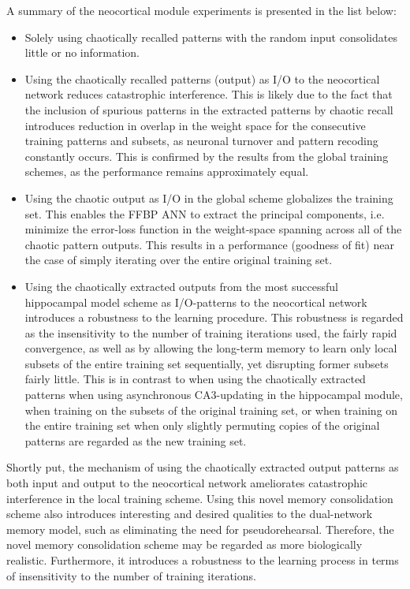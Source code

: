 A summary of the neocortical module experiments is presented in the list below:

\begin{itemize}
    \item Solely using chaotically recalled patterns with the random input consolidates little or no information.
    \item Using the chaotically recalled patterns (output) as I/O to the neocortical network reduces catastrophic interference. This is likely due to the fact that the inclusion of spurious patterns in the extracted patterns by chaotic recall introduces reduction in overlap in the weight space for the consecutive training patterns and subsets, as neuronal turnover and pattern recoding constantly occurs. This is confirmed by the results from the global training schemes, as the performance remains approximately equal.
    \item Using the chaotic output as I/O in the global scheme globalizes the training set. This enables the FFBP ANN to extract the principal components, i.e. minimize the error-loss function in the weight-space spanning across all of the chaotic pattern outputs. This results in a performance (goodness of fit) near the case of simply iterating over the entire original training set.
    \item Using the chaotically extracted outputs from the most successful hippocampal model scheme as I/O-patterns to the neocortical network introduces a robustness to the learning procedure. This robustness is regarded as the insensitivity to the number of training iterations used, the fairly rapid convergence, as well as by allowing the long-term memory to learn only local subsets of the entire training set sequentially, yet disrupting former subsets fairly little. This is in contrast to when using the chaotically extracted patterns when using asynchronous CA3-updating in the hippocampal module, when training on the subsets of the original training set, or when training on the entire training set when only slightly permuting copies of the original patterns are regarded as the new training set.
\end{itemize}

Shortly put, the mechanism of using the chaotically extracted output patterns as both input and output to the neocortical network ameliorates catastrophic interference in the local training scheme. Using this novel memory consolidation scheme also introduces interesting and desired qualities to the dual-network memory model, such as eliminating the need for pseudorehearsal. Therefore, the novel memory consolidation scheme may be regarded as more biologically realistic. Furthermore, it introduces a robustness to the learning process in terms of insensitivity to the number of training iterations.


